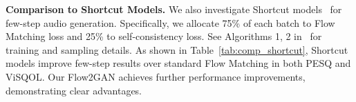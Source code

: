 \begin{table}[h!]
\centering
\caption{Comparison to pure GAN training on LibriTTS dev set with Mel-spectrogram conditioning.}
\vspace{-0.5em}
\label{tab:ablation_gan}
\setlength{\tabcolsep}{3pt} %
\vspace{-0.5em}
\end{table}


\noindent\textbf{Comparison to Shortcut Models.} 
We also investigate Shortcut models~\citep{shortcut} for few-step audio generation. Specifically, we allocate 75\% of each batch to Flow Matching loss and 25\% to self-consistency loss. See Algorithms 1, 2 in~\citep{shortcut} for training and sampling details. As shown in Table~\ref{tab:comp_shortcut}, Shortcut models improve few-step results over standard Flow Matching in both PESQ and ViSQOL. Our Flow2GAN achieves further performance improvements, demonstrating clear advantages.


